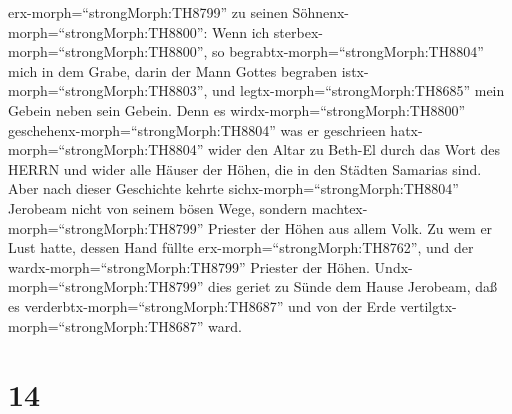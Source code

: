 erx-morph=``strongMorph:TH8799'' zu seinen
Söhnenx-morph=``strongMorph:TH8800'': Wenn ich
sterbex-morph=``strongMorph:TH8800'', so
begrabtx-morph=``strongMorph:TH8804'' mich in dem Grabe, darin der Mann
Gottes begraben istx-morph=``strongMorph:TH8803'', und
legtx-morph=``strongMorph:TH8685'' mein Gebein neben sein Gebein.
 Denn es wirdx-morph=``strongMorph:TH8800''
geschehenx-morph=``strongMorph:TH8804'' was er geschrieen
hatx-morph=``strongMorph:TH8804'' wider den Altar zu Beth-El durch das
Wort des HERRN und wider alle Häuser der Höhen, die in den Städten
Samarias sind.  Aber nach dieser Geschichte kehrte
sichx-morph=``strongMorph:TH8804'' Jerobeam nicht von seinem bösen Wege,
sondern machtex-morph=``strongMorph:TH8799'' Priester der Höhen aus
allem Volk. Zu wem er Lust hatte, dessen Hand füllte
erx-morph=``strongMorph:TH8762'', und der
wardx-morph=``strongMorph:TH8799'' Priester der Höhen. 
Undx-morph=``strongMorph:TH8799'' dies geriet zu Sünde dem Hause
Jerobeam, daß es verderbtx-morph=``strongMorph:TH8687'' und von der Erde
vertilgtx-morph=``strongMorph:TH8687'' ward.

\hypertarget{section-13}{%
\section{14}\label{section-13}}

